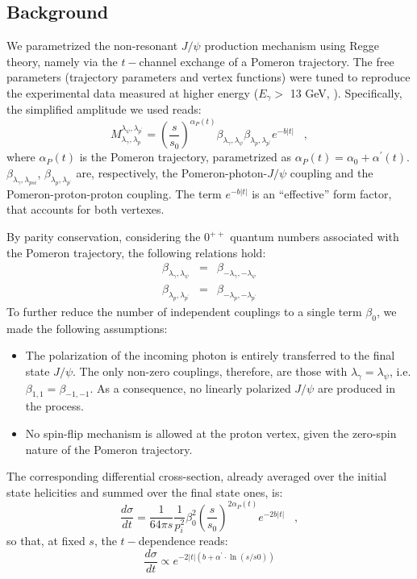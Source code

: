 \documentclass[a4paper,10pt]{article}
\begin{document}
\subsection{Background}

We parametrized the non-resonant $J/\psi$ production mechanism using Regge theory, namely via the $t-$channel exchange of a Pomeron trajectory. The free parameters (trajectory parameters and vertex functions) were tuned to reproduce the experimental data measured at higher energy ($E_\gamma > $  13 GeV, \cite{Camerini:1975cy}).
Specifically, the simplified amplitude we used reads:
\begin{equation}
M_{\lambda_\gamma,\lambda_p}^{\lambda_\psi,\lambda_{p^{\prime}}} = \left(\frac{s}{s_0}\right)^{\alpha_P(t)} \beta_{\lambda_\gamma,\lambda_\psi}\beta_{\lambda_p,\lambda_{p^\prime}} e^{-b|t|} \; \; \; ,
\end{equation}
where $\alpha_P(t)$ is the Pomeron trajectory, parametrized as $\alpha_P(t)=\alpha_0+\alpha^{\prime}(t)$. $\beta_{\lambda_\gamma,\lambda_{psi}}$, $\beta_{\lambda_p,\lambda_{p^{\prime}}}$ are, respectively, the Pomeron-photon-$J/\psi$ coupling and the Pomeron-proton-proton coupling. The term $e^{-b|t|}$ is an ``effective'' form factor, that accounts for both vertexes.

By parity conservation, considering the $0^{++}$ quantum numbers associated with the Pomeron trajectory, the following relations hold:
\begin{eqnarray}
\beta_{\lambda_\gamma,\lambda_{\psi}}&=&\beta_{-\lambda_\gamma,-\lambda_{\psi}}\\
\beta_{\lambda_p,\lambda_{p^{\prime}}}&=&\beta_{-\lambda_p,-\lambda_{p^{\prime}}}
\end{eqnarray}
To further reduce the number of independent couplings to a single term $\beta_0$, we made the following assumptions:
\begin{itemize}
\item{The polarization of the incoming photon is entirely transferred to the final state $J/\psi$. The only non-zero couplings, therefore, are those with $\lambda_\gamma=\lambda_{\psi}$, i.e. $\beta_{1,1}=\beta_{-1,-1}$. As a consequence, no linearly polarized $J/\psi$ are produced in the process.}
\item{No spin-flip mechanism is allowed at the proton vertex, given the zero-spin nature of the Pomeron trajectory.}
\end{itemize}

The corresponding differential cross-section, already averaged over the initial state helicities and summed over the final state ones, is:
\begin{equation}\label{eq:dsigma}
\frac{d\sigma}{dt}=\frac{1}{64\pi s}\frac{1}{p_i^2} \beta_0^2  \left(\frac{s}{s_0}\right)^{2\alpha_P(t)} e^{-2b|t|} \; \; \; ,
\end{equation}
so that, at fixed $s$, the $t-$dependence reads:
\begin{equation}
\frac{d\sigma}{dt} \propto e^{-2|t|(b+\alpha^\prime\cdot\ln(s/s0))}
\end{equation}
\end{document}
